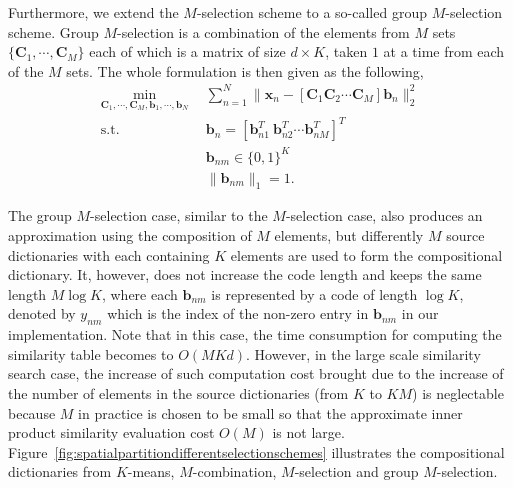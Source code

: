 \documentclass[10pt, letterpaper]{article}
\begin{document}



Furthermore,
we extend the $M$-selection scheme
to a so-called group $M$-selection scheme.
Group $M$-selection
is a combination of the elements from $M$ sets
$\{\mathbf{C}_1, \cdots, \mathbf{C}_M\}$ each of which is a matrix of size $d \times K$,
taken $1$ at a time from each of the $M$ sets.
The whole formulation is then given as the following,
\begin{align}
\min_{\mathbf{C}_1, \cdots, \mathbf{C}_M, \mathbf{b}_1, \cdots, \mathbf{b}_N}~& ~\sum\nolimits_{n=1}^N \|\mathbf{x}_n - \left[\mathbf{C}_1 \mathbf{C}_2 \cdots \mathbf{C}_M\right]\mathbf{b}_n\|_2^2 \nonumber  \\
\operatorname{s.t.}~& ~ \mathbf{b}_n = \left[\mathbf{b}_{n1}^T~\mathbf{b}_{n2}^T\cdots\mathbf{b}_{nM}^T\right]^T \nonumber  \\
&~ \mathbf{b}_{nm} \in \{0, 1\}^K \nonumber \\
&~ \|\mathbf{b}_{nm}\|_1=1. \label{eqn:complementarycompositecoding}
\end{align}

The group $M$-selection case,
similar to the $M$-selection case,
also produces an approximation using the composition of $M$ elements,
but differently $M$ source dictionaries
with each containing $K$ elements
are used to form the compositional dictionary.
It, however, does not increase the code length
and keeps the same length $M \log K$,
where each $\mathbf{b}_{nm}$ is represented
by a code of length $\log K$,
denoted by $y_{nm}$
which is
the index of the non-zero entry in $\mathbf{b}_{nm}$
in our implementation.
Note that in this case,
the time consumption for computing the similarity table becomes to $O(MKd)$.
However,
in the large scale similarity search case,
the increase of such computation cost
brought due to the increase of
the number of elements in the source dictionaries
(from $K$ to $KM$)
is neglectable
because $M$ in practice
is chosen to be small
so that the approximate inner product similarity evaluation cost $O(M)$ is not large.
Figure~\ref{fig:spatialpartitiondifferentselectionschemes}
illustrates the compositional dictionaries
from $K$-means, $M$-combination,
$M$-selection and group $M$-selection.
\end{document}
